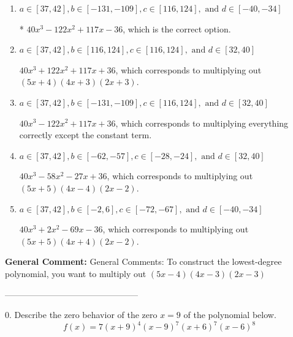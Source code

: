 \documentclass{extbook}[14pt]
\begin{document}
\begin{enumerate}[label=\Alph*.] 
\item $ a \in [37, 42], b \in [-131, -109], c \in [116, 124], \text{ and } d \in [-40, -34] $ 

 * $40x^{3} -122 x^{2} +117 x -36$, which is the correct option. 
\item $ a \in [37, 42], b \in [116, 124], c \in [116, 124], \text{ and } d \in [32, 40] $ 

 $40x^{3} +122 x^{2} +117 x + 36$, which corresponds to multiplying out $(5x + 4)(4x + 3)(2x + 3)$. 
\item $ a \in [37, 42], b \in [-131, -109], c \in [116, 124], \text{ and } d \in [32, 40] $ 

 $40x^{3} -122 x^{2} +117 x + 36$, which corresponds to multiplying everything correctly except the constant term. 
\item $ a \in [37, 42], b \in [-62, -57], c \in [-28, -24], \text{ and } d \in [32, 40] $ 

 $40x^{3} -58 x^{2} -27 x + 36$, which corresponds to multiplying out $(5x + 5)(4x -4)(2x -2)$. 
\item $ a \in [37, 42], b \in [-2, 6], c \in [-72, -67], \text{ and } d \in [-40, -34] $ 

 $40x^{3} +2 x^{2} -69 x -36$, which corresponds to multiplying out $(5x + 5)(4x + 4)(2x -2)$. 
\end{enumerate} 
 
\textbf{General Comment:} General Comments: To construct the lowest-degree polynomial, you want to multiply out $(5x -4)(4x -3)(2x -3)$ 

-----------------------------------------------

0. Describe the zero behavior of the zero $x = 9$ of the polynomial below.
\[ f(x) = 7(x + 9)^{4}(x - 9)^{7}(x + 6)^{7}(x - 6)^{8} \] 
\end{document}
